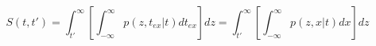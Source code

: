 \begin{equation}
S(t,t') = \int_{t'}^{\infty} \left[ \int_{-\infty}^\infty p(z,t_{ex}|t) dt_{ex}\right] dz =\int_{t'}^{\infty} \left[ \int_{-\infty}^\infty p(z,x|t) dx\right] dz
\end{equation}